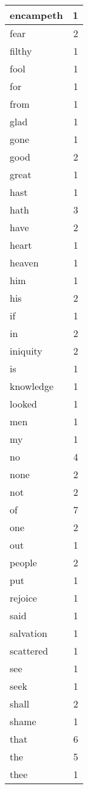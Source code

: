 \begin{center}
\begin{longtable}{l|r}
encampeth & 1 \\ \hline
fear & 2 \\ \hline
filthy & 1 \\ \hline
fool & 1 \\ \hline
for & 1 \\ \hline
from & 1 \\ \hline
glad & 1 \\ \hline
gone & 1 \\ \hline
good & 2 \\ \hline
great & 1 \\ \hline
hast & 1 \\ \hline
hath & 3 \\ \hline
have & 2 \\ \hline
heart & 1 \\ \hline
heaven & 1 \\ \hline
him & 1 \\ \hline
his & 2 \\ \hline
if & 1 \\ \hline
in & 2 \\ \hline
iniquity & 2 \\ \hline
is & 1 \\ \hline
knowledge & 1 \\ \hline
looked & 1 \\ \hline
men & 1 \\ \hline
my & 1 \\ \hline
no & 4 \\ \hline
none & 2 \\ \hline
not & 2 \\ \hline
of & 7 \\ \hline
one & 2 \\ \hline
out & 1 \\ \hline
people & 2 \\ \hline
put & 1 \\ \hline
rejoice & 1 \\ \hline
said & 1 \\ \hline
salvation & 1 \\ \hline
scattered & 1 \\ \hline
see & 1 \\ \hline
seek & 1 \\ \hline
shall & 2 \\ \hline
shame & 1 \\ \hline
that & 6 \\ \hline
the & 5 \\ \hline
thee & 1 \\ \hline

\end{longtable}
\end{center}
